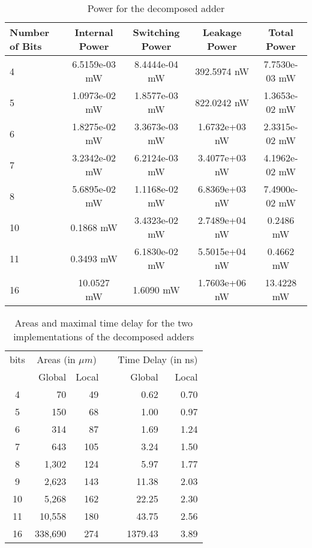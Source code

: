 \documentclass[12pt]{toptesi}
\begin{document}
\begin{table}
   \centering
        \caption{Power for the decomposed adder}
				\vspace{6pt}
        \begin{tabular}{l  c  c  c  c}
\toprule 
           Number of Bits & Internal Power & Switching Power & Leakage Power & Total Power\\
\midrule               
                4  & 6.5159e-03 mW & 8.4444e-04 mW & 392.5974 nW & 7.7530e-03 mW\\
                5  & 1.0973e-02 mW & 1.8577e-03 mW & 822.0242 nW & 1.3653e-02 mW \\
                6  & 1.8275e-02 mW & 3.3673e-03 mW & 1.6732e+03 nW & 2.3315e-02 mW \\
                7  & 3.2342e-02 mW & 6.2124e-03 mW & 3.4077e+03 nW & 4.1962e-02 mW \\
                8  & 5.6895e-02 mW & 1.1168e-02 mW & 6.8369e+03 nW & 7.4900e-02 mW \\
                10 & 0.1868 mW  & 3.4323e-02 mW & 2.7489e+04 nW  &  0.2486 mW \\
                11 & 0.3493 mW  & 6.1830e-02 mW & 5.5015e+04 nW  &  0.4662 mW \\
                16 & 10.0527 mW & 1.6090 mW     & 1.7603e+06 nW  & 13.4228 mW\\
 \bottomrule              
        \end{tabular}
        \label{tab:asic_power}
\end{table}

\begin{table}%
\centering
    \caption{Areas and maximal time delay for the two implementations of the decomposed adders}
		\vspace{6pt}
		\begin{tabular}{crrcrr}
\toprule
bits & \multicolumn{2}{c}{Areas (in $\unit{\mu m}$)}	&& \multicolumn{2}{c}{Time Delay (in ns)} \\
\cmidrule{2-3}
\cmidrule{5-6} 
  & Global & Local && Global & Local \\
\midrule 
4	 & 70 & 49 && 0.62 & 0.70 \\ 
5	 & 150 & 68 && 1.00 & 0.97 \\ 
6	 & 314 & 87 && 1.69 & 1.24 \\ 
7	 & 643 & 105 && 3.24 & 1.50 \\ 
8	 & 1,302 & 124 && 5.97 & 1.77 \\ 
9	 & 2,623 & 143 && 11.38 & 2.03 \\ 
10	 & 5,268 & 162 && 22.25 & 2.30 \\ 
11	 & 10,558 & 180 && 43.75 & 2.56 \\ 
16	 & 338,690 & 274 && 1379.43 & 3.89 \\ 
\bottomrule
\end{tabular}
   \label{tab:cla_vs_rca_area_timing}
\end{table}
\end{document}
